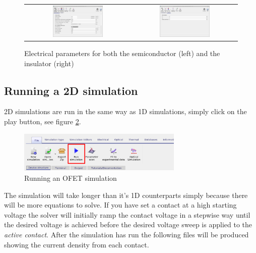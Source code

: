 \begin{figure}[H]
\centering
\begin{tabular}{ c c }

\includegraphics[width=0.5\textwidth,height=0.35\textwidth]{./images/ofet/ofet_5.png}

&
\includegraphics[width=0.5\textwidth,height=0.35\textwidth]{./images/ofet/ofet_6.png}
\\
\end{tabular}
\caption{Electrical parameters for both the semiconductor (left) and the insulator (right)}
\label{fig:ofetelectricalparamters}
\end{figure}

\subsection{Running a 2D simulation}

2D simulations are run in the same way as 1D simulations, simply click on the play button, see figure \ref{fig:ofetrun}.
\begin{figure}[H]
\centering
\includegraphics[width=0.7\textwidth]{./images/run_sim.png}
\caption{Running an OFET simulation}
\label{fig:ofetrun}
\end{figure}

The simulation will take longer than it's 1D counterparts simply because there will be more equations to solve.  If you have set a contact at a high starting voltage the solver will initially ramp the contact voltage in a stepwise way until the desired voltage is achieved before the desired voltage sweep is applied to the \emph{active contact}. After the simulation has run the following files will be produced showing the current density from each contact.

